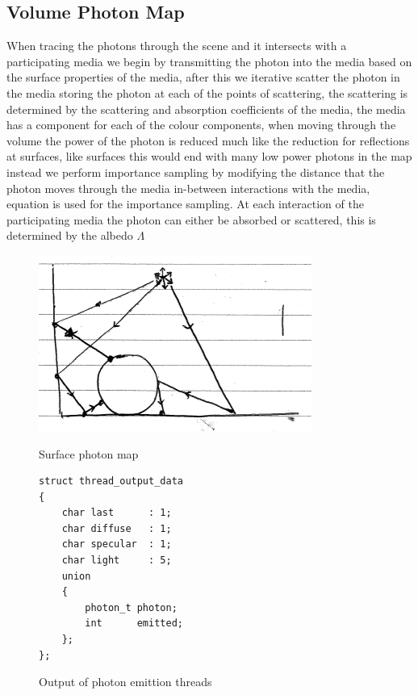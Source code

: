 \subsection{Volume Photon Map}
When tracing the photons through the scene and it intersects with a participating media we begin by transmitting the
photon into the media based on the surface properties of the media, after this we iterative scatter the photon in the
media storing the photon at each of the points of scattering, the scattering is determined by the scattering and
absorption coefficients of the media, the media has a component for each of the colour components, when moving through
the volume the power of the photon is reduced much like the reduction for reflections at surfaces, like surfaces this
would end with many low power photons in the map instead we perform importance sampling by modifying the distance that
the photon moves through the media in-between interactions with the media, equation 
is used for the importance sampling. At each interaction of the participating media the photon can either be absorbed
or scattered, this is determined by the albedo $\Lambda$ 


\begin{figure}
\centering
\includegraphics{./images/photon_mapping.png}
\label{fig:surface_photon_map}
\caption{Surface photon map}
\end{figure}

\begin{figure}
\begin{lstlisting}
struct thread_output_data
{
	char last      : 1;
	char diffuse   : 1;
	char specular  : 1;
	char light     : 5;
	union
	{
		photon_t photon;
		int      emitted;
	};
};
\end{lstlisting}
\caption{Output of photon emittion threads}
\end{figure}

